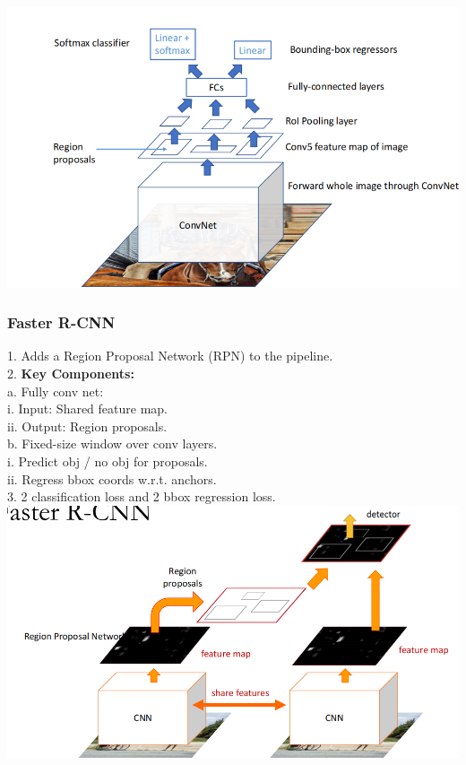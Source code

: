 \includegraphics[width=1\linewidth]{images/fast-rcnn.png}

\subsubsection{Faster R-CNN}
1. Adds a Region Proposal Network (RPN) to the pipeline. \\
2. \textbf{Key Components:} \\
   a. Fully conv net: \\
      i. Input: Shared feature map. \\
      ii. Output: Region proposals. \\
   b. Fixed-size window over conv layers. \\
      i. Predict obj / no obj for proposals. \\
      ii. Regress bbox coords w.r.t. anchors. \\
3. 2 classification loss and 2 bbox regression loss. \\

\includegraphics[width=0.9\linewidth]{images/faster-rcnn.png}

